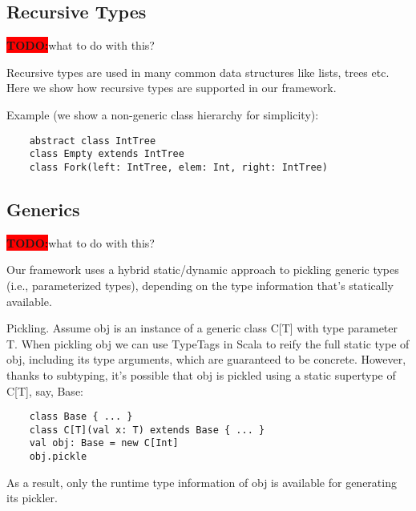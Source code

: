 \documentclass[preprint,10pt]{sigplanconf}
\theoremstyle{definition}
\newcommand{\todo}{{\bf \colorbox{red}{\color{white}TODO:}}}
\begin{document}
\subsection{Recursive Types}

\todo what to do with this?

Recursive types are used in many common data structures like lists, trees etc. Here we show how recursive types are supported in our framework.

Example (we show a non-generic class hierarchy for simplicity):

\begin{verbatim}
    abstract class IntTree
    class Empty extends IntTree
    class Fork(left: IntTree, elem: Int, right: IntTree)
\end{verbatim}

\subsection{Generics}

\todo what to do with this?

Our framework uses a hybrid static/dynamic approach to pickling generic types (i.e., parameterized types), depending on the type information that's statically available.

Pickling. Assume obj is an instance of a generic class C[T] with type parameter T. When pickling obj we can use TypeTags in Scala to reify the full static type of obj, including its type arguments, which are guaranteed to be concrete. However, thanks to subtyping, it's possible that obj is pickled using a static supertype of C[T], say, Base:

\begin{verbatim}
    class Base { ... }
    class C[T](val x: T) extends Base { ... }
    val obj: Base = new C[Int]
    obj.pickle
\end{verbatim}

As a result, only the runtime type information of obj is available for generating its pickler.


\end{document}
